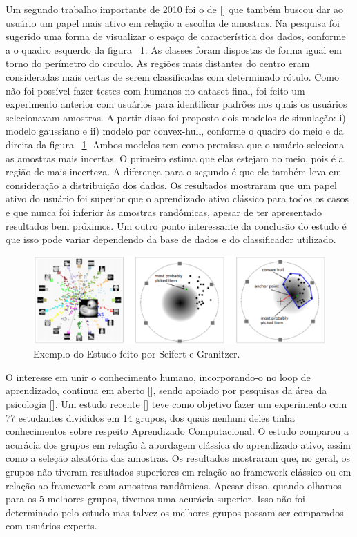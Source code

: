Um segundo trabalho importante de 2010 foi o de [\cite{seifert2010user}] que também buscou dar ao usuário um papel mais ativo em relação a escolha de amostras. Na pesquisa foi sugerido uma forma de visualizar o espaço de característica dos dados, conforme a o quadro esquerdo da figura ~\ref{fig:seifert_example}. As classes foram dispostas de forma igual em torno do perímetro do circulo. As regiões mais distantes do centro eram consideradas mais certas de serem classificadas com determinado rótulo. Como não foi possível fazer testes com humanos no dataset final, foi feito um experimento anterior com usuários para identificar padrões nos quais os usuários selecionavam amostras. A partir disso foi proposto dois modelos de simulação: i) modelo gaussiano e ii) modelo por convex-hull, conforme o quadro do meio e da direita da figura ~\ref{fig:seifert_example}. Ambos modelos tem como premissa que o usuário seleciona as amostras mais incertas. O primeiro estima que elas estejam no meio, pois é a região de mais incerteza. A diferença para o segundo é que ele também leva em consideração a distribuição dos dados. Os resultados mostraram que um papel ativo do usuário foi superior que o aprendizado ativo clássico para todos os casos e que nunca foi inferior às amostras randômicas, apesar de ter apresentado resultados bem próximos. Um outro ponto interessante da conclusão do estudo é que isso pode variar dependendo da base de dados e do classificador utilizado.

\begin{figure}
  \centering
  \includegraphics[width=1.0\textwidth]{figures/seifert_example.png}
  \caption{Exemplo do Estudo feito por Seifert e Granitzer.}
  \label{fig:seifert_example}
\end{figure}

O interesse em unir o conhecimento humano, incorporando-o no loop de aprendizado, continua em aberto [\cite{calma2016active}], sendo apoiado por pesquisas da área da psicologia [\cite{sim2015children}]. Um estudo recente [\cite{kottke2018other}] teve como objetivo fazer um experimento com 77 estudantes divididos em 14 grupos, dos quais nenhum deles tinha conhecimentos sobre respeito Aprendizado Computacional. O estudo comparou a acurácia dos grupos em relação à abordagem clássica do aprendizado ativo, assim como a seleção aleatória das amostras. Os resultados mostraram que, no geral, os grupos não tiveram resultados superiores em relação ao framework clássico ou em relação ao framework com amostras randômicas. Apesar disso, quando olhamos para os 5 melhores grupos, tivemos uma acurácia superior. Isso não foi determinado pelo estudo mas talvez os melhores grupos possam ser comparados com usuários experts. 

